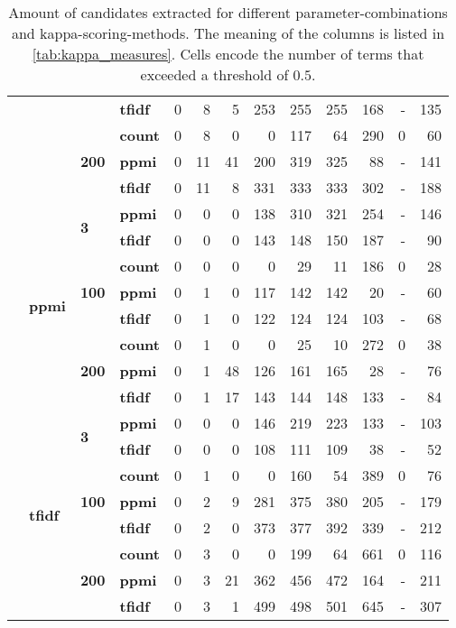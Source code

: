 \begin{table}[H]
{\begin{tabular}{llllrrrrrrrrr}
	 &  &  & \textbf{tfidf} & 0 & 8 & 5 & 253 & 255 & 255 & 168 & - & 135 \\
	\cline{3-4}
	 &  & \multirow[t]{3}{*}{\textbf{200}} & \textbf{count} & 0 & 8 & 0 & 0 & 117 & 64 & 290 & 0 & 60 \\
	 &  &  & \textbf{ppmi} & 0 & {\cellcolor{lightgreen}} 11 & 41 & 200 & 319 & 325 & 88 & - & 141 \\
	 &  &  & \textbf{tfidf} & 0 & {\cellcolor{lightgreen}} 11 & 8 & 331 & 333 & 333 & 302 & - & 188 \\
	\cline{2-4} \cline{3-4}
	 & \multirow[t]{8}{*}{\textbf{ppmi}} & \multirow[t]{2}{*}{\textbf{3}} & \textbf{ppmi} & 0 & 0 & 0 & 138 & 310 & 321 & 254 & - & 146 \\
	 &  &  & \textbf{tfidf} & 0 & 0 & 0 & 143 & 148 & 150 & 187 & - & 90 \\
	\cline{3-4}
	 &  & \multirow[t]{3}{*}{\textbf{100}} & \textbf{count} & 0 & 0 & 0 & 0 & 29 & 11 & 186 & 0 & 28 \\
	 &  &  & \textbf{ppmi} & 0 & 1 & 0 & 117 & 142 & 142 & 20 & - & 60 \\
	 &  &  & \textbf{tfidf} & 0 & 1 & 0 & 122 & 124 & 124 & 103 & - & 68 \\
	\cline{3-4}
	 &  & \multirow[t]{3}{*}{\textbf{200}} & \textbf{count} & 0 & 1 & 0 & 0 & 25 & 10 & 272 & 0 & 38 \\
	 &  &  & \textbf{ppmi} & 0 & 1 & 48 & 126 & 161 & 165 & 28 & - & 76 \\
	 &  &  & \textbf{tfidf} & 0 & 1 & 17 & 143 & 144 & 148 & 133 & - & 84 \\
	\cline{2-4} \cline{3-4}
	 & \multirow[t]{8}{*}{\textbf{tfidf}} & \multirow[t]{2}{*}{\textbf{3}} & \textbf{ppmi} & 0 & 0 & 0 & 146 & 219 & 223 & 133 & - & 103 \\
	 &  &  & \textbf{tfidf} & 0 & 0 & 0 & 108 & 111 & 109 & 38 & - & 52 \\
	\cline{3-4}
	 &  & \multirow[t]{3}{*}{\textbf{100}} & \textbf{count} & 0 & 1 & 0 & 0 & 160 & 54 & 389 & 0 & 76 \\
	 &  &  & \textbf{ppmi} & 0 & 2 & 9 & 281 & 375 & 380 & 205 & - & 179 \\
	 &  &  & \textbf{tfidf} & 0 & 2 & 0 & 373 & 377 & 392 & 339 & - & 212 \\
	\cline{3-4}
	 &  & \multirow[t]{3}{*}{\textbf{200}} & \textbf{count} & 0 & 3 & 0 & 0 & 199 & 64 & 661 & 0 & 116 \\
	 &  &  & \textbf{ppmi} & 0 & 3 & 21 & 362 & 456 & 472 & 164 & - & 211 \\
	 &  &  & \textbf{tfidf} & 0 & 3 & 1 & 499 & 498 & 501 & 645 & - & 307 \\
	\bottomrule
	\end{tabular}
	}
	\caption[Amount of candidates extracted for different parameter-combinations]{Amount of candidates extracted for different parameter-combinations and kappa-scoring-methods. The meaning of the columns is listed in \autoref{tab:kappa_measures}. Cells encode the number of terms that exceeded a threshold of $0.5$.
	\label{tab:kappa_table}}
	\label{tab:cands_per_config}
\end{table}

